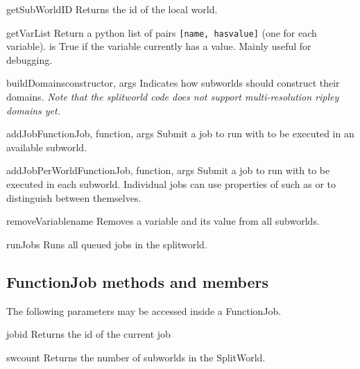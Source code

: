 \begin{methoddesc}[SplitWorld]{getSubWorldID}{}
Returns the id of the local world.
\end{methoddesc}

\begin{methoddesc}[SplitWorld]{getVarList}{}
Return a python list of pairs \texttt{[name, hasvalue]} (one for each variable).
 is True if the variable currently has a value.
Mainly useful for debugging.
\end{methoddesc}

\begin{funcdesc}{buildDomains}{constructor, args}
Indicates how subworlds should construct their domains.
\emph{Note that the splitworld code does not support multi-resolution ripley domains yet.}
\end{funcdesc}

\begin{funcdesc}{addJob}{FunctionJob, function, args}
Submit a job to run  with  to be executed in an available subworld.
\end{funcdesc}

\begin{funcdesc}{addJobPerWorld}{FunctionJob, function, args}
Submit a job to run  with  to be executed in each subworld.
Individual jobs can use properties of  such as  or  to distinguish between
themselves.
\end{funcdesc}

\begin{methoddesc}[SplitWorld]{removeVariable}{name}
Removes a variable and its value from all subworlds.
\end{methoddesc}

\begin{funcdesc}{runJobs}{ }
Runs all queued jobs in the splitworld.
\end{funcdesc}

\subsection{FunctionJob methods and members}
The following parameters may be accessed inside a FunctionJob.

\begin{memberdesc}[FunctionJob]{jobid}
Returns the id of the current job
\end{memberdesc}

\begin{memberdesc}[FunctionJob]{swcount}
Returns the number of subworlds in the SplitWorld. 
\end{memberdesc}

